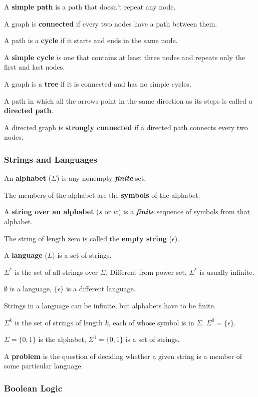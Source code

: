 A \textbf{simple path} is a path that doesn't repeat any node.

A graph is \textbf{connected} if every two nodes have a path between them. 

A path is a \textbf{cycle} if it starts and ends in the same node.

A \textbf{simple cycle} is one that contains at least three nodes and repeats only the first and last nodes.

A graph is a \textbf{tree} if it is connected and has no simple cycles.

A path in which all the arrows point in the same direction as its steps is called a \textbf{directed path}. 

A directed graph is \textbf{strongly connected} if a directed path connects every two nodes.

\subsubsection{Strings and Languages}

An \textbf{alphabet} ($\Sigma$) is any nonempty \textbf{\textit{finite}} set. 

The members of the alphabet are the \textbf{symbols} of the alphabet.

A \textbf{string over an alphabet} ($s$ or $w$) is a \textbf{\textit{finite}} sequence of symbols from that alphabet.

The string of length zero is called the \textbf{empty string} ($\epsilon$).

A \textbf{language} ($L$) is a set of strings.

$\Sigma^*$ is the set of all strings over $\Sigma$.
{\color{blue} Different from power set, $\Sigma^*$ is usually infinite.}

{\color{blue} $\emptyset$ is a language, $\{\epsilon\}$ is a different language.}

Strings in a language can be infinite, but alphabets have to be finite.

$\Sigma^k$ is the set of strings of length $k$, each of whose symbol is in $\Sigma$. $\Sigma^0 = \{\epsilon\}$.

$\Sigma = \{0, 1\}$ is the alphabet, $\Sigma^1 = \{0, 1\}$ is a set of strings.

A \textbf{problem} is the question of deciding whether a given string is a member of some particular language.

\subsubsection{Boolean Logic}

